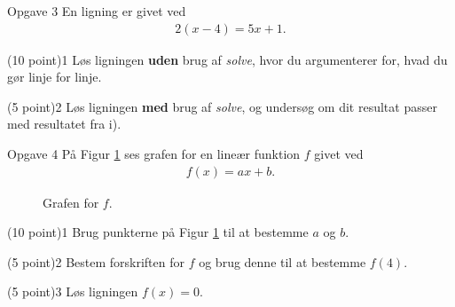 \begin{opgavetekst}{Opgave 3}
	En ligning er givet ved
	\begin{align*}
		2(x-4) = 5x+1.
	\end{align*}
\end{opgavetekst}
\begin{delopgave}{(10 point)}{1}
	Løs ligningen \textbf{uden} brug af \textit{solve}, hvor du argumenterer for, hvad du gør linje for linje.
\end{delopgave}
\begin{delopgave}{(5 point)}{2}
	Løs ligningen \textbf{med} brug af \textit{solve}, og undersøg om dit resultat passer med resultatet fra i).
\end{delopgave}

\begin{opgavetekst}{Opgave 4}
	På Figur \ref{fig:oneline} ses grafen for en lineær funktion $f$ givet ved
	\begin{align*}
		f(x) = ax + b.
	\end{align*}
	\begin{figure}[H]
		\centering
		\caption{Grafen for $f$.}
		\label{fig:oneline}
	\end{figure}\phantom{h}
\end{opgavetekst}
\begin{delopgave}{(10 point)}{1}
	Brug punkterne på Figur \ref{fig:oneline} til at bestemme $a$ og $b$. 
\end{delopgave}
\begin{delopgave}{(5 point)}{2}
	Bestem forskriften for $f$ og brug denne til at bestemme $f(4)$. 
\end{delopgave}
\begin{delopgave}{(5 point)}{3}
	Løs ligningen $f(x) = 0$.
\end{delopgave}

